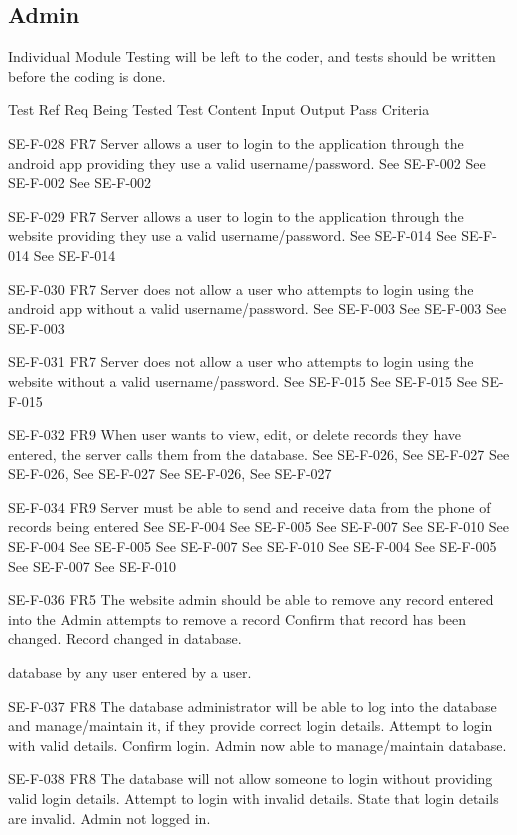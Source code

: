 \subsection{Admin}

Individual Module Testing will be left to the coder, and tests should be written before the coding is done.

Test Ref Req Being Tested Test Content Input Output Pass Criteria

SE-F-028 FR7 Server allows a user to login to the application through the android app providing they use a valid username/password. See SE-F-002 See SE-F-002 See SE-F-002

SE-F-029 FR7 Server allows a user to login to the application through the website providing they use a valid username/password. See SE-F-014 See SE-F-014 See SE-F-014

SE-F-030 FR7 Server does not allow a user who attempts to login using the android app without a valid username/password. See SE-F-003 See SE-F-003 See SE-F-003

SE-F-031 FR7 Server does not allow a user who attempts to login using the website without a valid username/password. See SE-F-015 See SE-F-015 See SE-F-015

SE-F-032 FR9 When user wants to view, edit, or delete records they have entered, the server calls them from the database. See SE-F-026, See SE-F-027 See SE-F-026, See SE-F-027 See SE-F-026, See SE-F-027

SE-F-034 FR9 Server must be able to send and receive data from the phone of records being entered See SE-F-004 See SE-F-005 See SE-F-007 See SE-F-010 See SE-F-004 See SE-F-005 See SE-F-007 See SE-F-010 See SE-F-004 See SE-F-005 See SE-F-007 See SE-F-010

SE-F-036 FR5 The website admin should be able to remove any record entered into the Admin attempts to remove a record Confirm that record has been changed. Record changed in database.

database by any user entered by a user.

SE-F-037 FR8 The database administrator will be able to log into the database and manage/maintain it, if they provide correct login details. Attempt to login with valid details. Confirm login. Admin now able to manage/maintain database.

SE-F-038 FR8 The database will not allow someone to login without providing valid login details. Attempt to login with invalid details. State that login details are invalid. Admin not logged in.

